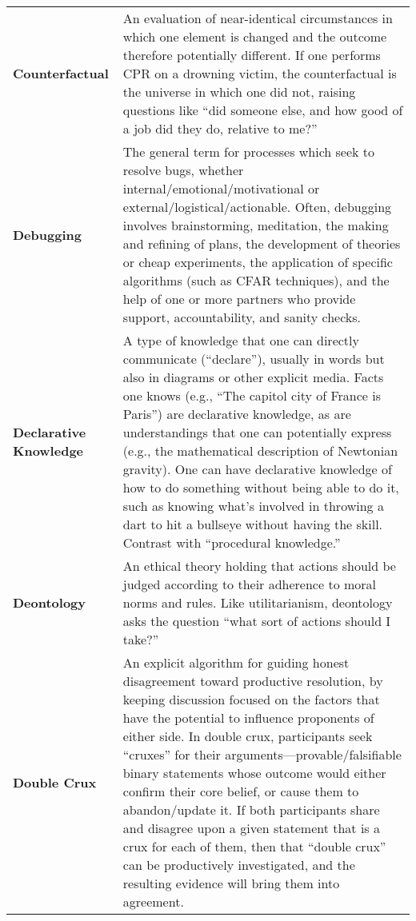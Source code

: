 \begin{longtable} { p{} p{} }
\textbf{Counterfactual} & An evaluation of near-identical circumstances in which one element is changed and the outcome therefore potentially different.  If one performs CPR on a drowning victim, the counterfactual is the universe in which one did not, raising questions like ``did someone else, and how good of a job did they do, relative to me?''\\

\textbf{Debugging} & The general term for processes which seek to resolve bugs, whether internal/emotional/motivational or external/logistical/actionable.  Often, debugging involves brainstorming, meditation, the making and refining of plans, the development of theories or cheap experiments, the application of specific algorithms (such as CFAR techniques), and the help of one or more partners who provide support, accountability, and sanity checks.\\

\textbf{Declarative Knowledge} & A type of knowledge that one can directly communicate (``declare''), usually in words but also in diagrams or other explicit media. Facts one knows (e.g., ``The capitol city of France is Paris'') are declarative knowledge, as are understandings that one can potentially express (e.g., the mathematical description of Newtonian gravity). One can have declarative knowledge of how to do something without being able to do it, such as knowing what's involved in throwing a dart to hit a bullseye without having the skill. Contrast with ``procedural knowledge.''\\

\textbf{Deontology} & An ethical theory holding that actions should be judged according to their adherence to moral norms and rules.  Like utilitarianism, deontology asks the question ``what sort of actions should I take?''\\

\textbf{Double Crux} & An explicit algorithm for guiding honest disagreement toward productive resolution, by keeping discussion focused on the factors that have the potential to influence proponents of either side.  In double crux, participants seek ``cruxes'' for their arguments---provable/falsifiable binary statements whose outcome would either confirm their core belief, or cause them to abandon/update it.  If both participants share and disagree upon a given statement that is a crux for each of them, then that ``double crux'' can be productively investigated, and the resulting evidence will bring them into agreement.\\


\end{longtable}

